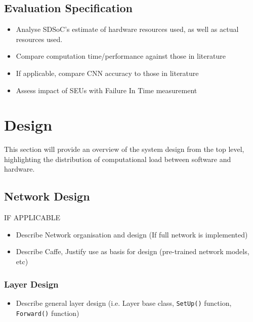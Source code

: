\documentclass[12pt]{article}
\begin{document}
\subsection{Evaluation Specification}
\label{sec:ProjSpec-EvalSpec}
\vspace{-12pt}

\begin{itemize}
\item Analyse SDSoC's estimate of hardware resources used, as well as actual resources used.
\item Compare computation time/performance against those in literature
\item If applicable, compare CNN accuracy to those in literature
\item Assess impact of SEUs with Failure In Time measurement
\end{itemize}

\newpage

\section{Design}
\label{sec:Design}
\vspace{-12pt}

This section will provide an overview of the system design from the top level, highlighting the distribution of computational load between software and hardware.

\subsection{Network Design}
\label{sec:Design-Network}
\vspace{-12pt}

IF APPLICABLE
\begin{itemize}
\item Describe Network organisation and design (If full network is implemented)
\item Describe Caffe, Justify use as basis for design (pre-trained network models, etc)
\end{itemize}

\subsubsection{Layer Design}
\label{sec:Design-Network-Layers}
\vspace{-12pt}

\begin{itemize}
\item Describe general layer design (i.e. Layer base class, \verb|SetUp()| function, \verb|Forward()| function)
\end{itemize}
\end{document}
